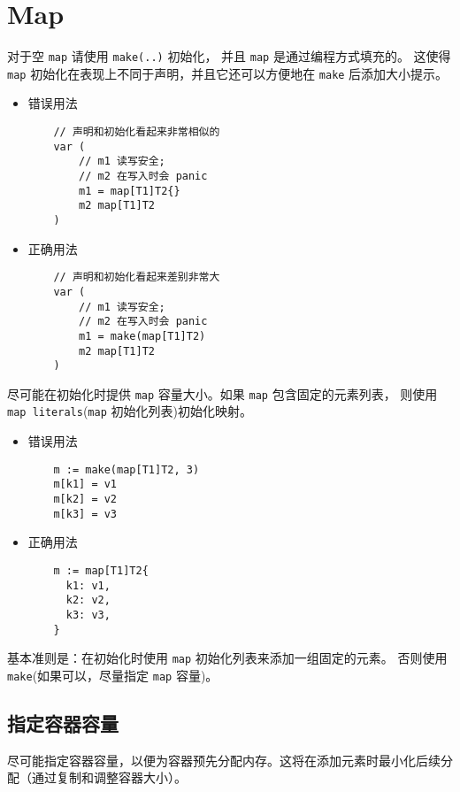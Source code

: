 \chapter{Map}
对于空 \texttt{map} 请使用 \texttt{make(..)} 初始化， 并且 \texttt{map} 是通过编程方式填充的。
这使得 \texttt{map} 初始化在表现上不同于声明，并且它还可以方便地在 \texttt{make} 后添加大小提示。
\begin{itemize}[leftmargin=4em]
\item 错误用法

  \begin{verbatim}
    // 声明和初始化看起来非常相似的
    var (
    	// m1 读写安全;
    	// m2 在写入时会 panic
    	m1 = map[T1]T2{}
    	m2 map[T1]T2
    )
  \end{verbatim}
\item 正确用法

  \begin{verbatim}
    // 声明和初始化看起来差别非常大
    var (
    	// m1 读写安全;
    	// m2 在写入时会 panic
    	m1 = make(map[T1]T2)
    	m2 map[T1]T2
    )
  \end{verbatim}
\end{itemize}

尽可能在初始化时提供 \texttt{map} 容量大小。如果 \texttt{map} 包含固定的元素列表，
则使用 \texttt{map literals}(\texttt{map} 初始化列表)初始化映射。
\begin{itemize}[leftmargin=4em]
\item 错误用法

  \begin{verbatim}
    m := make(map[T1]T2, 3)
    m[k1] = v1
    m[k2] = v2
    m[k3] = v3
  \end{verbatim}
\item 正确用法

  \begin{verbatim}
    m := map[T1]T2{
      k1: v1,
      k2: v2,
      k3: v3,
    }
  \end{verbatim}
\end{itemize}

基本准则是：在初始化时使用 \texttt{map} 初始化列表来添加一组固定的元素。
否则使用 \texttt{make}(如果可以，尽量指定 \texttt{map} 容量)。

\section{指定容器容量}
尽可能指定容器容量，以便为容器预先分配内存。这将在添加元素时最小化后续分配（通过复制和调整容器大小）。

